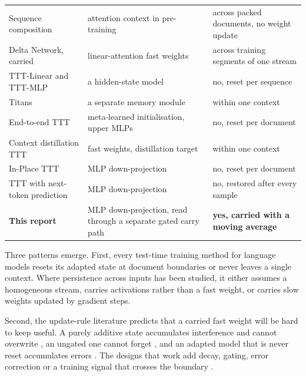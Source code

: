 \documentclass[12pt,a4paper]{report}
\begin{document}
\begin{table}[H]
\begin{tabularx}{\linewidth}{>{\raggedright\arraybackslash}p{4.4cm}>{\raggedright\arraybackslash}X>{\raggedright\arraybackslash}p{4.2cm}}
    Sequence composition \citep{zhao2024analysing} & attention context in pre-training & across packed documents, no weight update \\
    Delta Network, carried \citep{schlag2021linear} & linear-attention fast weights & across training segments of one stream \\
    TTT-Linear and TTT-MLP \citep{sun2025learning} & a hidden-state model & no, reset per sequence \\
    Titans \citep{behrouz2025titans} & a separate memory module & within one context \\
    End-to-end TTT \citep{tandon2025endtoend} & meta-learned initialisation, upper MLPs & no, reset per document \\
    Context distillation TTT \citep{wang2026learning} & fast weights, distillation target & within one context \\
    In-Place TTT \citep{feng2026inplace} & MLP down-projection & no, reset per document \\
    TTT with next-token prediction \citep{ouyang2026ttt} & MLP down-projection & no, restored after every sample \\
    \textbf{This report} & MLP down-projection, read through a separate gated carry path & \textbf{yes, carried with a moving average} \\
    \bottomrule
  \end{tabularx}
\end{table}

Three patterns emerge. First, every test-time training method for language models resets its adapted state at document boundaries or never leaves a single context. Where persistence across inputs has been studied, it either assumes a homogeneous stream, carries activations rather than a fast weight, or carries slow weights updated by gradient steps.

Second, the update-rule literature predicts that a carried fast weight will be hard to keep useful. A purely additive state accumulates interference and cannot overwrite \citep{schlag2021linear,yang2024deltanet}, an ungated one cannot forget \citep{yang2024gla,mao2022finetuning}, and an adapted model that is never reset accumulates errors \citep{maharana2026continual}. The designs that work add decay, gating, error correction or a training signal that crosses the boundary \citep{yang2025gated,bulatov2022rmt,chevalier2023adapting,kim2026delayed}.
\end{document}
